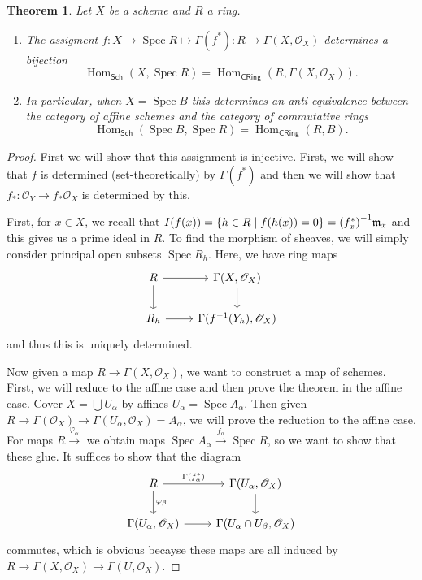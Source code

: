 \documentclass[leqno, openany]{memoir}
\newtheorem{thm}{Theorem}[section]
\theoremstyle{definition}
\theoremstyle{remark}
\theoremstyle{plain}
\theoremstyle{definition}
\theoremstyle{remark}
\newcommand{\mf}[1]{\mathfrak{#1}}
\newcommand{\ms}[1]{\mathsf{#1}}
\newcommand{\msc}[1]{\mathscr{#1}}
\DeclareMathOperator{\Hom}{Hom}
\DeclareMathOperator{\Spec}{Spec}
\begin{document}
\begin{thm}
    Let $X$ be a scheme and $R$ a ring. 
    \begin{enumerate}
        \item The assigment $f \colon X \to \Spec R \mapsto \Gamma(f^*) \colon R \to \Gamma(X, \msc{O}_X)$ determines a bijection
            \[ \Hom_{\ms{Sch}}(X, \Spec R) = \Hom_{\ms{CRing}}(R, \Gamma(X, \msc{O}_X)). \]
        \item In particular, when $X = \Spec B$ this determines an anti-equivalence between the category of affine schemes and the category of commutative rings
            \[ \Hom_{\ms{Sch}}(\Spec B, \Spec R) = \Hom_{\ms{CRing}}(R, B). \]
    \end{enumerate}
\end{thm}

\begin{proof}
    First we will show that this assignment is injective. First, we will show that $f$ is determined (set-theoretically) by $\Gamma(f^*)$ and then we will show that $f_* \colon \msc{O}_Y \to f_* \msc{O}_X$ is determined by this.

    First, for $x \in X$, we recall that $I(f(x)) = \qty{h \in R \mid f(h(x)) = 0} = { (f_x^*) }^{-1} \mf{m}_x$ and this gives us a prime ideal in $R$. To find the morphism of sheaves, we will simply consider principal open subsets $\Spec R_h$. Here, we have ring maps
    \begin{equation*}
    \begin{tikzcd}
        R \arrow{r} \arrow{d} & \Gamma(X, \msc{O}_X) \arrow{d} \\
        R_h \arrow{r} & \Gamma (f^{-1}(Y_h), \msc{O}_X)
    \end{tikzcd}
    \end{equation*}
    and thus this is uniquely determined.

    Now given a map $R \to \Gamma(X, \msc{O}_X)$, we want to construct a map of schemes. First, we will reduce to the affine case and then prove the theorem in the affine case. Cover $X = \bigcup U_{\alpha}$ by affines $U_{\alpha} = \Spec A_{\alpha}$. Then given $R \to \Gamma(\msc{O}_X) \to \Gamma(U_{\alpha}, \msc{O}_X) = A_{\alpha}$, we will prove the reduction to the affine case. For maps $R \xrightarrow{\varphi_{\alpha}}$ we obtain maps $\Spec A_{\alpha} \xrightarrow{f_{\alpha}} \Spec R$, so we want to show that these glue. It suffices to show that the diagram
    \begin{equation*}
    \begin{tikzcd}
        R \arrow{r}{\Gamma(f_{\alpha}^*)} \arrow{d}{\varphi_{\beta}} & \Gamma(U_{\alpha}, \msc{O}_X) \arrow{d} \\
        \Gamma(U_{\alpha}, \msc{O}_X) \arrow{r} & \Gamma(U_{\alpha} \cap U_{\beta}, \msc{O}_X)
    \end{tikzcd}
    \end{equation*}
    commutes, which is obvious becayse these maps are all induced by $R \to \Gamma(X, \msc{O}_X) \to \Gamma(U, \msc{O}_X)$.


\end{proof}
\end{document}
